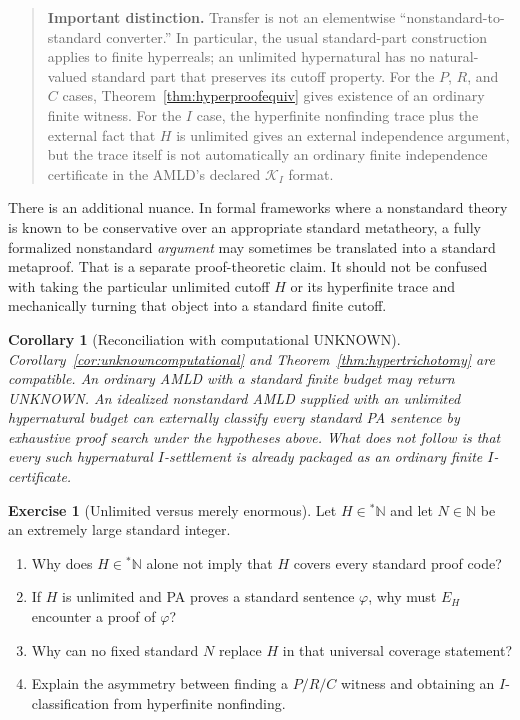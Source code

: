 \documentclass[11pt,openany]{book}
\newtheorem{corollary}[theorem]{Corollary}
\theoremstyle{definition}
\newtheorem{exercise}[theorem]{Exercise}
\theoremstyle{remark}
\newenvironment{warningbox}{\begin{quote}\small\color{red!50!black}\textbf{Important distinction.} }{\end{quote}}
\newcommand{\N}{\mathbb{N}}
\begin{document}
\begin{warningbox}
Transfer is not an elementwise ``nonstandard-to-standard converter.'' In particular, the usual standard-part construction applies to finite hyperreals; an unlimited hypernatural has no natural-valued standard part that preserves its cutoff property. For the $P$, $R$, and $C$ cases, Theorem~\ref{thm:hyperproofequiv} gives existence of an ordinary finite witness. For the $I$ case, the hyperfinite nonfinding trace plus the external fact that $H$ is unlimited gives an external independence argument, but the trace itself is not automatically an ordinary finite independence certificate in the AMLD's declared $\mathcal K_I$ format.
\end{warningbox}

There is an additional nuance. In formal frameworks where a nonstandard theory is known to be conservative over an appropriate standard metatheory, a fully formalized nonstandard \emph{argument} may sometimes be translated into a standard metaproof. That is a separate proof-theoretic claim. It should not be confused with taking the particular unlimited cutoff $H$ or its hyperfinite trace and mechanically turning that object into a standard finite cutoff.

\begin{corollary}[Reconciliation with computational UNKNOWN]\label{cor:unknownhyper}
Corollary~\ref{cor:unknowncomputational} and Theorem~\ref{thm:hypertrichotomy} are compatible. An ordinary AMLD with a standard finite budget may return \textsf{UNKNOWN}. An idealized nonstandard AMLD supplied with an unlimited hypernatural budget can externally classify every standard PA sentence by exhaustive proof search under the hypotheses above. What does not follow is that every such hypernatural $I$-settlement is already packaged as an ordinary finite $I$-certificate.
\end{corollary}

\begin{exercise}[Unlimited versus merely enormous]\label{ex:hyperbudget}
Let $H\in{}^*\N$ and let $N\in\N$ be an extremely large standard integer.
\begin{enumerate}[label=(\alph*)]
\item Why does $H\in{}^*\N$ alone not imply that $H$ covers every standard proof code?
\item If $H$ is unlimited and PA proves a standard sentence $\varphi$, why must $E_H$ encounter a proof of $\varphi$?
\item Why can no fixed standard $N$ replace $H$ in that universal coverage statement?
\item Explain the asymmetry between finding a $P/R/C$ witness and obtaining an $I$-classification from hyperfinite nonfinding.
\end{enumerate}
\end{exercise}
\end{document}
